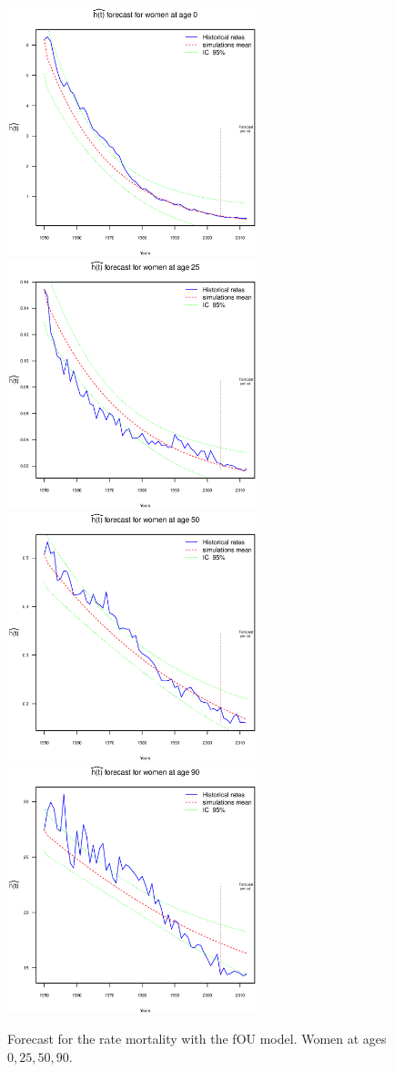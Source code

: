 \documentclass[smallextended]{svjour3}
\begin{document}
\begin{figure}[H]
    \includegraphics[width = 2.85in]{PlotWomenForecast0.eps}
    \includegraphics[width = 2.85in]{PlotWomenForecast25.eps}
    \includegraphics[width = 2.85in]{PlotWomenForecast50.eps}
    \includegraphics[width = 2.85in]{PlotWomenForecast90.eps}
    \caption{Forecast for the rate mortality with the fOU model. Women at ages
    $0,25,50,90$.}
    \label{graph-graph-forecast_women_FOU1}
\end{figure}\vspace*{0.1cm}
\end{document}

